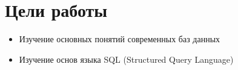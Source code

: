 \section{Цели работы}

\begin{itemize}
\item Изучение основных понятий современных баз данных
\item Изучение основ языка SQL (Structured Query Language)
\end{itemize}


